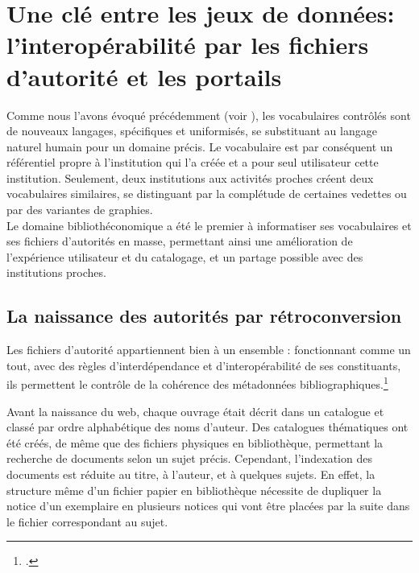 \section{\label{I-A-3}Une clé entre les jeux de données: l'interopérabilité par les fichiers d'autorité et les portails}

Comme nous l'avons évoqué précédemment (voir ), les vocabulaires contrôlés sont de nouveaux langages, spécifiques et uniformisés, se substituant au langage naturel humain pour un domaine précis. Le vocabulaire est par conséquent un référentiel propre à l'institution qui l'a créée et a pour seul utilisateur cette institution. Seulement, deux institutions aux activités proches créent deux vocabulaires similaires, se distinguant par la complétude de certaines vedettes ou par des variantes de graphies.\\

Le domaine bibliothéconomique a été le premier à informatiser ses vocabulaires et ses fichiers d'autorités en masse, permettant ainsi une amélioration de l'expérience utilisateur et du catalogage, et un partage possible avec des institutions proches.

\subsection{\label{I-A-3-a}La naissance des autorités par rétroconversion}

\begin{citationLongue}
	Les fichiers d'autorité appartiennent bien à un	ensemble : fonctionnant comme un tout, avec des règles d’interdépendance et d’interopérabilité de ses constituants, ils permettent le contrôle de	la cohérence des métadonnées bibliographiques.\footcite[p.6]{aymonin_arabesques_2017}
\end{citationLongue}

Avant la naissance du web, chaque ouvrage était décrit dans un catalogue et classé par ordre alphabétique des noms d'auteur. Des catalogues thématiques ont été créés, de même que des fichiers physiques en bibliothèque, permettant la recherche de documents selon un sujet précis. Cependant, l'indexation des documents est réduite au titre, à l'auteur, et à quelques sujets. En effet, la structure même d'un fichier papier en bibliothèque nécessite de dupliquer la notice d'un exemplaire en plusieurs notices qui vont être placées par la suite dans le fichier correspondant au sujet.\\

